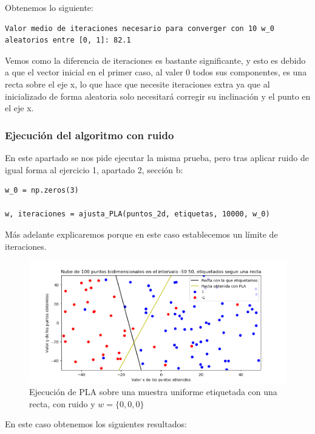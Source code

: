 \documentclass[12pt, spanish]{article}
\begin{document}
Obtenemos lo siguiente:

\begin{lstlisting}
Valor medio de iteraciones necesario para converger con 10 w_0 aleatorios entre [0, 1]: 82.1
\end{lstlisting}


Vemos como la diferencia de iteraciones es bastante significante, y esto es debido a que el vector inicial en el primer caso, al valer 0 todos sus componentes, es una recta sobre el eje x, lo que hace que necesite iteraciones extra ya que al inicializado de forma aleatoria solo necesitará corregir su inclinación y el punto en el eje x.


\subsubsection{Ejecución del algoritmo con ruido}

En este apartado se nos pide ejecutar la misma prueba, pero tras aplicar ruido de igual forma al ejercicio 1, apartado 2, sección b:

\begin{lstlisting}
w_0 = np.zeros(3)

w, iteraciones = ajusta_PLA(puntos_2d, etiquetas, 10000, w_0)
\end{lstlisting}

Más adelante explicaremos porque en este caso establecemos un límite de iteraciones.

\begin{figure}[H]
  \centering
      \includegraphics[scale = 0.70]{ej-2-PLA-ruido.png}
 		 \caption{Ejecución de PLA sobre una muestra uniforme etiquetada con una recta, con ruido y $w = \{0, 0, 0\}$}
  		\label{fig:ej2-PLA}

\end{figure}

En este caso obtenemos los siguientes resultados:
\end{document}
